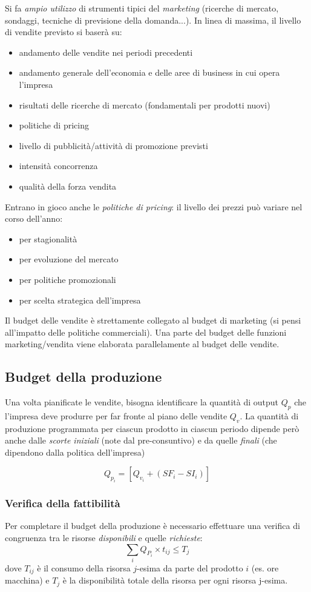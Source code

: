 Si fa \emph{ampio utilizzo} di strumenti tipici del \emph{marketing} (ricerche di
mercato, sondaggi, tecniche di previsione della domanda...). In linea di massima, il livello di vendite previsto si baserà
su:
\begin{itemize}
	\item andamento delle vendite nei periodi precedenti
	\item andamento generale dell’economia e delle aree di
	business in cui opera l’impresa
	\item risultati delle ricerche di mercato (fondamentali per
	prodotti nuovi)
	\item politiche di pricing
	\item livello di pubblicità/attività di promozione previsti
	\item intensità concorrenza
	\item qualità della forza vendita
\end{itemize}

Entrano in gioco anche le \emph{politiche di pricing}:
il livello dei prezzi può
variare nel corso dell’anno:
\begin{itemize}
	\item per stagionalità
	\item per evoluzione del mercato
	\item per politiche promozionali
	\item per scelta strategica dell’impresa
\end{itemize}

Il budget delle vendite è strettamente collegato al budget
di marketing (si pensi all’impatto delle politiche commerciali).
Una parte del budget delle funzioni marketing/vendita viene
elaborata parallelamente al budget delle vendite.

\subsection{Budget della produzione}
Una volta pianificate le vendite, bisogna identificare la
quantità di output $Q_p$ che l’impresa deve produrre per far
fronte al piano delle vendite $Q_v$.
La quantità di produzione programmata per ciascun prodotto
in ciascun periodo dipende però anche dalle \emph{scorte iniziali}
(note dal pre-consuntivo) e da quelle \emph{finali} (che dipendono
dalla politica dell’impresa)

\[
	Q_{p_i} = \left[Q_{v_i} + \left(SF_i - SI_i\right)\right]
\]

\subsubsection{Verifica della fattibilità}
Per completare il budget della produzione è necessario effettuare una
verifica di congruenza tra le risorse \emph{disponibili} e quelle \emph{richieste}:
\[
	\sum_i Q_{P_i} \times t_{ij} \le T_j
\]
dove $T_{ij}$ \`e il consumo della risorsa $j$-esima da parte del prodotto $i$ (es. ore
macchina) e $T_j$ \`e la disponibilità totale della risorsa
per ogni risorsa j-esima.


